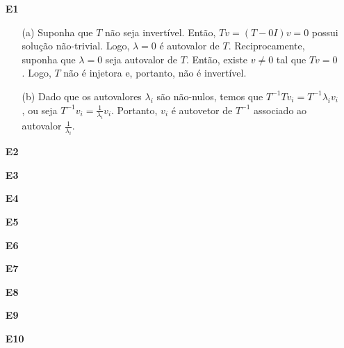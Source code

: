\documentclass[12pt]{article}
\begin{document}
\begin{enumerate}
    \item[\textbf{E1}]
        \begin{enumerate}
            \item[(a)] Suponha que \(T\) não seja invertível. Então, \(Tv=(T-0I)v=0\) possui solução não-trivial. Logo, \(\lambda=0\) é autovalor de \(T\). Reciprocamente, suponha que \(\lambda = 0\) seja autovalor de \(T\). Então, existe \(v \neq 0\) tal que \(Tv=0\). Logo, \(T\) não é injetora e, portanto, não é invertível.
            \item[(b)] Dado que os autovalores \(\lambda_i\) são não-nulos, temos que \(T^{-1}Tv_i = T^{-1}\lambda_i v_i\), ou seja \(T^{-1}v_i = \frac{1}{\lambda_i} v_i\). Portanto, \(v_i\) é autovetor de \(T^{-1}\) associado ao autovalor \(\frac{1}{\lambda_i}\).
        \end{enumerate}
    \item[\textbf{E2}] 
    \item[\textbf{E3}] 
    \item[\textbf{E4}] 
    \item[\textbf{E5}] 
    \item[\textbf{E6}] 
    \item[\textbf{E7}] 
    \item[\textbf{E8}] 
    \item[\textbf{E9}] 
    \item[\textbf{E10}]
\end{enumerate}
\end{document}
